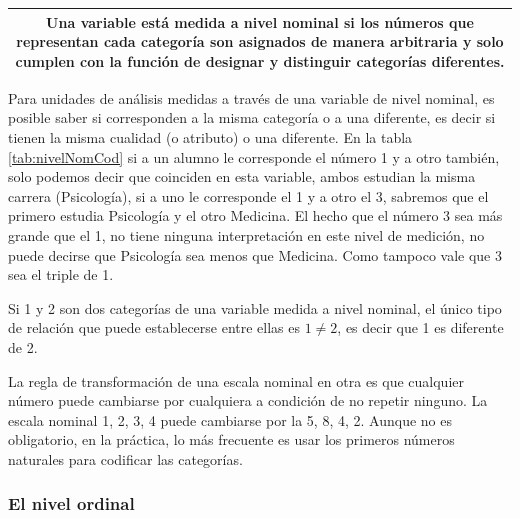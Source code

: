 \documentclass[]{book}
\begin{document}
\begin{longtable}[]{@{}c@{}}
\toprule
\endhead
\begin{minipage}[t]{0.97\columnwidth}\centering
Una variable está medida a nivel \textbf{nominal} si los números que representan cada categoría son asignados de manera arbitraria y solo cumplen con la función de designar y distinguir categorías diferentes.\strut
\end{minipage}\tabularnewline
\bottomrule
\end{longtable}

Para unidades de análisis medidas a través de una variable de nivel nominal, es posible saber si corresponden a la misma categoría o a una diferente, es decir si tienen la misma cualidad (o atributo) o una diferente.
En la tabla \ref{tab:nivelNomCod} si a un alumno le corresponde el número 1 y a otro también, solo podemos decir que coinciden en esta variable, ambos estudian la misma carrera (Psicología), si a uno le corresponde el 1 y a otro el 3, sabremos que el primero estudia Psicología y el otro Medicina. El hecho que el número 3 sea más grande que el 1, no tiene ninguna interpretación en este nivel de medición, no puede decirse que Psicología sea menos que Medicina. Como tampoco vale que 3 sea el triple de 1.

Si 1 y 2 son dos categorías de una variable medida a nivel nominal, el único tipo de relación que puede establecerse entre ellas es \(1\neq2\), es decir que 1 es diferente de 2.

La regla de transformación de una escala nominal en otra es que cualquier número puede cambiarse por cualquiera a condición de no repetir ninguno. La escala nominal 1, 2, 3, 4 puede cambiarse por la 5, 8, 4, 2. Aunque no es obligatorio, en la práctica, lo más frecuente es usar los primeros números naturales para codificar las categorías.

\hypertarget{el-nivel-ordinal}{%
\subsubsection{El nivel ordinal}\label{el-nivel-ordinal}}
\end{document}
